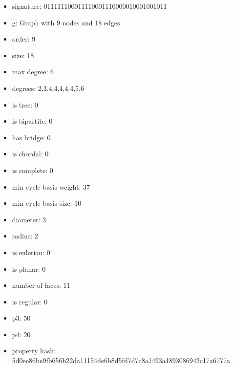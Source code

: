 \newpage
\begin{figure}
\end{figure}
\begin{itemize}
\item signature: 011111100011110001110000010001001011
\item g: Graph with 9 nodes and 18 edges
\item order: 9
\item size: 18
\item max degree: 6
\item degrees: 2,3,4,4,4,4,4,5,6
\item is tree: 0
\item is bipartite: 0
\item has bridge: 0
\item is chordal: 0
\item is complete: 0
\item min cycle basis weight: 37
\item min cycle basis size: 10
\item diameter: 3
\item radius: 2
\item is eulerian: 0
\item is planar: 0
\item number of faces: 11
\item is regular: 0
\item p3: 50
\item p4: 20
\item property hash: 5d0ee86be9fb656b22da11154de6b8d5fd7d7c8a1493a1893086942c17a6777a
\end{itemize}
